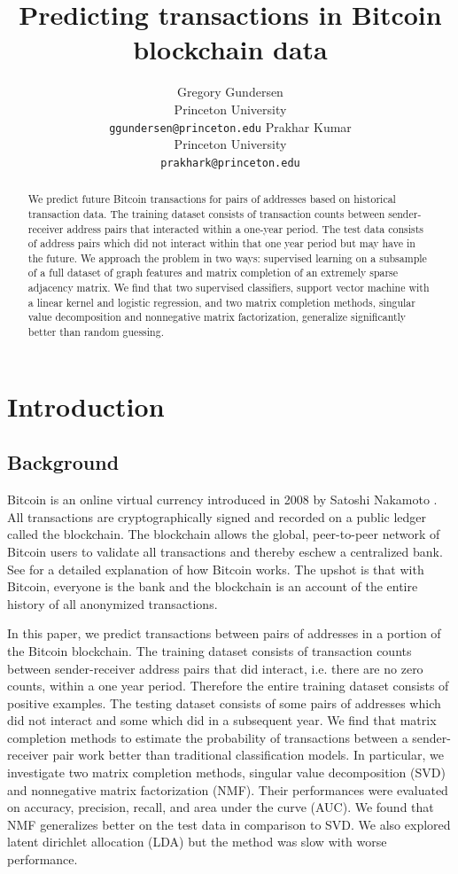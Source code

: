 \documentclass{article} %
\title{Predicting transactions in Bitcoin blockchain data}
\author{
Gregory Gundersen\\
Princeton University\\
\texttt{ggundersen@princeton.edu}
\And
Prakhar Kumar \\
Princeton University \\
\texttt{prakhark@princeton.edu} \\
}
\begin{document}
\maketitle

\begin{abstract}
We predict future Bitcoin transactions for pairs of addresses based on historical transaction data. The training dataset consists of transaction counts between sender-receiver address pairs that interacted within a one-year period. The test data consists of address pairs which did not interact within that one year period but may have in the future. We approach the problem in two ways: supervised learning on a subsample of a full dataset of graph features and matrix completion of an extremely sparse adjacency matrix. We find that two supervised classifiers, support vector machine with a linear kernel and logistic regression, and two matrix completion methods, singular value decomposition and nonnegative matrix factorization, generalize significantly better than random guessing.
\end{abstract}

\section{Introduction}

\subsection{Background}

Bitcoin is an online virtual currency introduced in 2008 by Satoshi Nakamoto \cite{nakamoto2008bitcoin}. All transactions are cryptographically signed and recorded on a public ledger called the blockchain. The blockchain allows the global, peer-to-peer network of Bitcoin users to validate all transactions and thereby eschew a centralized bank. See \cite{nielsen2013bitcoin} for a detailed explanation of how Bitcoin works. The upshot is that with Bitcoin, everyone is the bank and the blockchain is an account of the entire history of all anonymized transactions.

In this paper, we predict transactions between pairs of addresses in a portion of the Bitcoin blockchain. The training dataset consists of transaction counts between sender-receiver address pairs that did interact, i.e. there are no zero counts, within a one year period. Therefore the entire training dataset consists of positive examples. The testing dataset consists of some pairs of addresses which did not interact and some which did in a subsequent year. We find that matrix completion methods to estimate the probability of transactions between a sender-receiver pair work better than traditional classification models. In particular, we investigate two matrix completion methods, singular value decomposition (SVD) and nonnegative matrix factorization (NMF). Their performances were evaluated on accuracy, precision, recall, and area under the curve (AUC). We found that NMF generalizes better on the test data in comparison to SVD. We also explored latent dirichlet allocation (LDA) but the method was slow with worse performance.
\end{document}
